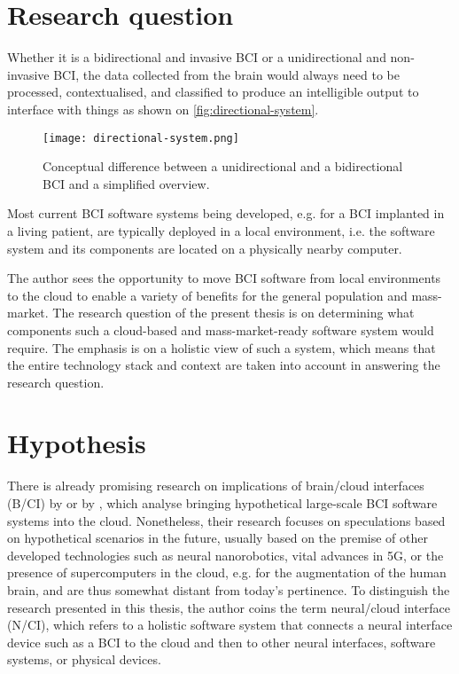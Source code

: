 \section{Research question}
\label{chapter1-research-question}

Whether it is a bidirectional and invasive BCI or a unidirectional and non-invasive BCI, the data collected from the brain would always need to be processed, contextualised, and classified to produce an intelligible output to interface with things as shown on \autoref{fig:directional-system}.

\begin{figure}[ht]
  \centering
  \texttt{[image: directional-system.png]}
  \caption{Conceptual difference between a unidirectional and a bidirectional BCI and a simplified overview.}
  \label{fig:directional-system}
\end{figure}

Most current BCI software systems being developed, e.g. for a BCI implanted in a living patient, are typically deployed in a local environment, i.e. the software system and its components are located on a physically nearby computer.

The author sees the opportunity to move BCI software from local environments to the cloud to enable a variety of benefits for the general population and mass-market. The research question of the present thesis is on determining what components such a cloud-based and mass-market-ready software system would require. The emphasis is on a holistic view of such a system, which means that the entire technology stack and context are taken into account in answering the research question.

\section{Hypothesis}
\label{chapter1-hypothesis}

There is already promising research on implications of brain/cloud interfaces (B/CI) by \citeauthor{martins_human_2019} \citeyearpar{martins_human_2019} or by \citeauthor{angelica_cognitive_2021} \citeyearpar{angelica_cognitive_2021}, which analyse bringing hypothetical large-scale BCI software systems into the cloud. Nonetheless, their research focuses on speculations based on hypothetical scenarios in the future, usually based on the premise of other developed technologies such as neural nanorobotics, vital advances in 5G, or the presence of supercomputers in the cloud, e.g. for the augmentation of the human brain, and are thus somewhat distant from today's pertinence. To distinguish the research presented in this thesis, the author coins the term neural/cloud interface (N/CI), which refers to a holistic software system that connects a neural interface device such as a BCI to the cloud and then to other neural interfaces, software systems, or physical devices.

